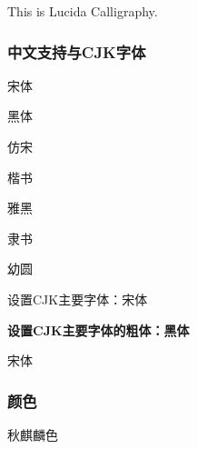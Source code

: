 \documentclass[twoside]{ctexart}
\begin{document}
            {\lucida This is Lucida Calligraphy.}


        \subsubsection{中文支持与CJK字体}
            {\songti 宋体}

            {\heiti 黑体}

            {\fangsong 仿宋}

            {\kaishu 楷书}

            {\yahei 雅黑}

            {\lishu 隶书}

            {\youyuan 幼圆}
            
            设置CJK主要字体：宋体

            \textbf{设置CJK主要字体的粗体：黑体}
        

            {\songtii 宋体}


        \subsubsection{颜色}\label{subsubsec:3.4.6}
            {\color{goldenrod}秋麒麟色}
\end{document}
